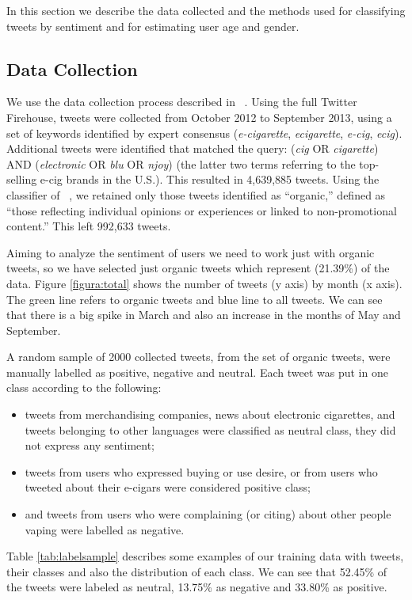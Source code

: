 \documentclass{sig-alternate}
\newcommand{\citenoun}[1]{{\citeauthor{#1}~\cite{#1}}}
\begin{document}
In this section we describe the data collected and the methods used for classifying tweets by sentiment and for estimating user age and gender.

\subsection{Data Collection}
\label{sec:data}
We use the data collection process described in
\citenoun{huang2014cross}. Using the full Twitter Firehouse, tweets were
collected from October 2012 to September 2013, using a set of keywords
identified by expert consensus ({\it e-cigarette}, {\it ecigarette}, {\it
  e-cig}, {\it ecig}). Additional tweets were identified that matched the
query: ({\it cig} OR {\it cigarette}) AND ({\it electronic} OR {\it blu} OR
{\it njoy}) (the latter two terms referring to the top-selling e-cig brands in
the U.S.). This resulted in 4,639,885 tweets. Using the classifier of
\citenoun{huang2014cross}, we retained only those tweets identified as
``organic,'' defined as ``those reflecting individual opinions or experiences
or linked to non-promotional content.'' This left 992,633 tweets.

Aiming to analyze the sentiment of users we need to work just with organic tweets, so we have selected just organic tweets which represent (21.39\%) of the data. Figure \ref{figura:total} shows the number of tweets (y axis) by month (x axis). The green line refers to organic tweets and blue line to all tweets. We can see that there is a big spike in March and also an increase in the months of May and September.


A random sample of 2000 collected tweets, from the set of organic tweets, were manually labelled as positive, negative and neutral. Each tweet was put in one class according to the following:
\begin{itemize}
\item  tweets from merchandising companies, news about electronic cigarettes, and tweets belonging to other languages were classified as neutral class, they did not express any sentiment; 
\item  tweets from users who expressed buying or use desire, or from users who tweeted about their e-cigars were considered positive class; 
\item  and tweets from users who were complaining (or citing) about other people vaping were labelled as negative. 
\end{itemize}

Table \ref{tab:labelsample} describes some examples of our training data with tweets, their classes and also the distribution of each class. We can see that 52.45\% of the tweets were labeled as neutral, 13.75\% as negative and 33.80\% as positive. 
\end{document}
